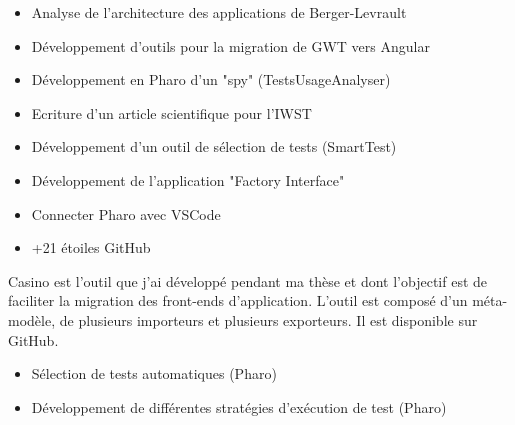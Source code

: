 \documentclass[10pt,a4paper,ragged2e,withhyper]{altacv}
\begin{document}
\divider

\begin{itemize}
\item Analyse de l’architecture des applications de Berger-Levrault
\item Développement d'outils pour la migration de GWT vers Angular
\end{itemize}

\divider

\begin{itemize}
  \item Développement en Pharo d'un "spy" (TestsUsageAnalyser)
  \item Ecriture d'un article scientifique pour l'IWST
  \item Développement d'un outil de sélection de tests (SmartTest)
\end{itemize}

\divider

\begin{itemize}
  \item Développement de l'application "Factory Interface"
\end{itemize}

\newpage


\begin{itemize}
\item Connecter Pharo avec VSCode
\item +21 étoiles GitHub
\end{itemize}

\divider


Casino est l'outil que j'ai développé pendant ma thèse et dont l'objectif est de faciliter la migration des front-ends d'application.
L'outil est composé d'un méta-modèle, de plusieurs importeurs et plusieurs exporteurs.
Il est disponible sur GitHub.

\divider

\begin{itemize}
\item Sélection de tests automatiques (Pharo)
\item Développement de différentes stratégies d’exécution de test (Pharo)
\end{itemize}
\end{document}
